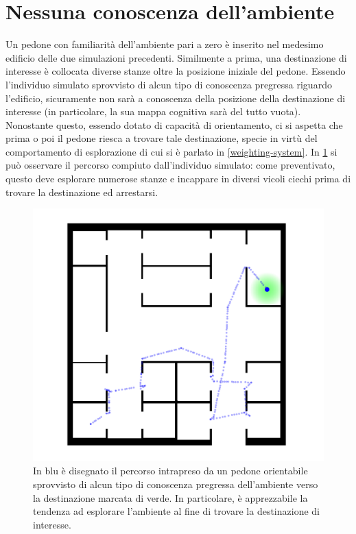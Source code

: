 \documentclass[12pt,a4paper,openright,oneside]{book}
\begin{document}
\section{Nessuna conoscenza dell'ambiente}
\label{no-knowledge-case-study}
Un pedone con familiarità dell'ambiente pari a zero è inserito nel medesimo edificio delle due simulazioni precedenti. Similmente a prima, una destinazione di interesse è collocata diverse stanze oltre la posizione iniziale del pedone. Essendo l'individuo simulato sprovvisto di alcun tipo di conoscenza pregressa riguardo l'edificio, sicuramente non sarà a conoscenza della posizione della destinazione di interesse (in particolare, la sua mappa cognitiva sarà del tutto vuota). Nonostante questo, essendo dotato di capacità di orientamento, ci si aspetta che prima o poi il pedone riesca a trovare tale destinazione, specie in virtù del comportamento di esplorazione di cui si è parlato in \ref{weighting-system}. In \cref{fig:no-knowledge} si può osservare il percorso compiuto dall'individuo simulato: come preventivato, questo deve esplorare numerose stanze e incappare in diversi vicoli ciechi prima di trovare la destinazione ed arrestarsi.
\begin{figure}
	\centering
	\includegraphics[width=0.7\linewidth]{figures/no-knowledge.png}
	\caption{In blu è disegnato il percorso intrapreso da un pedone orientabile sprovvisto di alcun tipo di conoscenza pregressa dell'ambiente verso la destinazione marcata di verde. In particolare, è apprezzabile la tendenza ad esplorare l'ambiente al fine di trovare la destinazione di interesse.}
	\label{fig:no-knowledge}
\end{figure}
\end{document}

